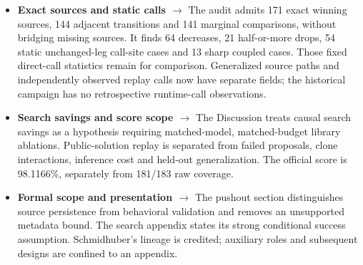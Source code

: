 \documentclass[10pt]{article}
\begin{document}
\begin{itemize}
\item \textbf{Exact sources and static calls $\rightarrow$} The audit admits 171 exact winning sources, 144 adjacent transitions and 141 marginal comparisons, without bridging missing sources. It finds 64 decreases, 21 half-or-more drops, 54 static unchanged-leg call-site cases and 13 sharp coupled cases. Those fixed direct-call statistics remain for comparison. Generalized source paths and independently observed replay calls now have separate fields; the historical campaign has no retrospective runtime-call observations.
\item \textbf{Search savings and score scope $\rightarrow$} The Discussion treats causal search savings as a hypothesis requiring matched-model, matched-budget library ablations. Public-solution replay is separated from failed proposals, clone interactions, inference cost and held-out generalization. The official score is 98.1166\%, separately from 181/183 raw coverage.
\item \textbf{Formal scope and presentation $\rightarrow$} The pushout section distinguishes source persistence from behavioral validation and removes an unsupported metadata bound. The search appendix states its strong conditional success assumption. Schmidhuber's lineage is credited; auxiliary roles and subsequent designs are confined to an appendix.
\end{itemize}
\end{document}
